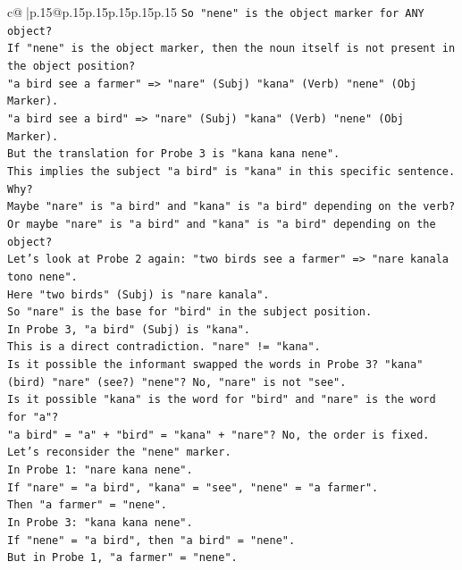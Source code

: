 \documentclass{article}
\begin{document}
{\begin{supertabular}{c@{$\;$}|p{.15\linewidth}@{}p{.15\linewidth}p{.15\linewidth}p{.15\linewidth}p{.15\linewidth}p{.15\linewidth}}
{{{\texttt{So "nene" is the object marker for ANY object?} \\
\texttt{If "nene" is the object marker, then the noun itself is not present in the object position?} \\
\texttt{"a bird see a farmer" => "nare" (Subj) "kana" (Verb) "nene" (Obj Marker).} \\
\texttt{"a bird see a bird" => "nare" (Subj) "kana" (Verb) "nene" (Obj Marker).} \\
\texttt{But the translation for Probe 3 is "kana kana nene".} \\
\texttt{This implies the subject "a bird" is "kana" in this specific sentence.} \\
\texttt{Why?} \\
\texttt{Maybe "nare" is "a bird" and "kana" is "a bird" depending on the verb?} \\
\texttt{Or maybe "nare" is "a bird" and "kana" is "a bird" depending on the object?} \\
\texttt{Let's look at Probe 2 again: "two birds see a farmer" => "nare kanala tono nene".} \\
\texttt{Here "two birds" (Subj) is "nare kanala".} \\
\texttt{So "nare" is the base for "bird" in the subject position.} \\
\texttt{In Probe 3, "a bird" (Subj) is "kana".} \\
\texttt{This is a direct contradiction. "nare" != "kana".} \\
\texttt{Is it possible the informant swapped the words in Probe 3? "kana" (bird) "nare" (see?) "nene"? No, "nare" is not "see".} \\
\texttt{Is it possible "kana" is the word for "bird" and "nare" is the word for "a"?} \\
\texttt{"a bird" = "a" + "bird" = "kana" + "nare"? No, the order is fixed.} \\
\texttt{Let's reconsider the "nene" marker.} \\
\texttt{In Probe 1: "nare kana nene".} \\
\texttt{If "nare" = "a bird", "kana" = "see", "nene" = "a farmer".} \\
\texttt{Then "a farmer" = "nene".} \\
\texttt{In Probe 3: "kana kana nene".} \\
\texttt{If "nene" = "a bird", then "a bird" = "nene".} \\
\texttt{But in Probe 1, "a farmer" = "nene".} \\
}}}
\end{supertabular}}
\end{document}
